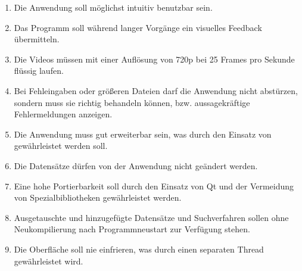 \begin{enumerate} [label=\bfseries /NF \arabic*0/, leftmargin=*]
  \item Die Anwendung soll möglichst intuitiv benutzbar sein.
  \item Das Programm soll während langer Vorgänge ein visuelles Feedback übermitteln.
  \item Die Videos müssen mit einer Auflösung  von 720p bei 25 Frames pro Sekunde flüssig laufen.
  \item Bei Fehleingaben oder größeren Dateien darf die Anwendung nicht abstürzen, sondern muss sie richtig behandeln können, bzw. aussagekräftige Fehlermeldungen anzeigen.
  \item Die Anwendung muss gut erweiterbar sein, was durch den Einsatz von  gewährleistet werden soll.
  \item Die Datensätze dürfen von der Anwendung nicht geändert werden.
  \item Eine hohe Portierbarkeit soll durch den Einsatz von \gls{Qt} und der Vermeidung von Spezialbibliotheken gewährleistet werden.
  \item Ausgetauschte und hinzugefügte Datensätze und \gls{Suchverfahren} sollen ohne Neukompilierung nach Programmneustart zur Verfügung stehen.
  \item Die Oberfläche soll nie einfrieren, was durch einen separaten Thread gewährleistet wird.
\end{enumerate}
\pagebreak
